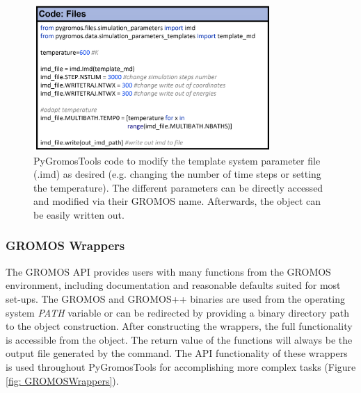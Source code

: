 \begin{figure}[h]
    \centering
    \includegraphics[width=0.8\textwidth]{fig/ApplicationExamples/codeExample_GROMOSFiles.png}
    \caption{PyGromosTools code to modify the template system parameter file (.imd) as desired (e.g. changing the number of time steps or setting the temperature). The different parameters can be directly accessed and modified via their GROMOS name. Afterwards, the object can be easily written out.}
    \label{fig: FileHandlingExampleIMD}
\end{figure}


\subsubsection{GROMOS Wrappers}
The GROMOS API provides users with many functions from the GROMOS environment, including documentation and reasonable defaults suited for most set-ups. The GROMOS and GROMOS++ binaries are used from the operating system \textit{PATH} variable or can be redirected by providing a binary directory path to the object construction. After constructing the wrappers, the full functionality is accessible from the object. The return value of the functions will always be the output file generated by the command. The API functionality of these wrappers is used throughout PyGromosTools for accomplishing more complex tasks (Figure \ref{fig: GROMOSWrappers}).

